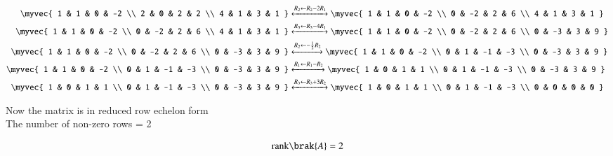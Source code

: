 \documentclass[journal]{IEEEtran}
\begin{document}
\begin{align}
\myvec{
1 & 1 & 0 & -2 \\
2 & 0 & 2 & 2 \\
4 & 1 & 3 & 1
}
&\xleftrightarrow[]{R_2 \leftarrow R_2 - 2R_1}
\myvec{
1 & 1 & 0 & -2 \\
0 & -2 & 2 & 6 \\
4 & 1 & 3 & 1
} \\
\myvec{
1 & 1 & 0 & -2 \\
0 & -2 & 2 & 6 \\
4 & 1 & 3 & 1
}&\xleftrightarrow[]{R_3 \leftarrow R_3 - 4R_1}
\myvec{
1 & 1 & 0 & -2 \\
0 & -2 & 2 & 6 \\
0 & -3 & 3 & 9
} \\
\myvec{
1 & 1 & 0 & -2 \\
0 & -2 & 2 & 6 \\
0 & -3 & 3 & 9
}&\xleftrightarrow[]{R_2 \leftarrow -\frac{1}{2} R_2}
\myvec{
1 & 1 & 0 & -2 \\
0 & 1 & -1 & -3 \\
0 & -3 & 3 & 9
} \\
\myvec{
1 & 1 & 0 & -2 \\
0 & 1 & -1 & -3 \\
0 & -3 & 3 & 9
}&\xleftrightarrow[]{R_1 \leftarrow R_1 - R_2}
\myvec{
1 & 0 & 1 & 1 \\
0 & 1 & -1 & -3 \\
0 & -3 & 3 & 9
} \\
\myvec{
1 & 0 & 1 & 1 \\
0 & 1 & -1 & -3 \\
0 & -3 & 3 & 9
}&\xleftrightarrow[]{R_3 \leftarrow R_3 + 3 R_2}
\myvec{
1 & 0 & 1 & 1 \\
0 & 1 & -1 & -3 \\
0 & 0 & 0 & 0
}
\end{align}

Now the matrix is in reduced row echelon form \\
The number of non-zero rows = 2

\begin{align}
    \text{rank}\brak{A} = 2
\end{align}
\end{document}
